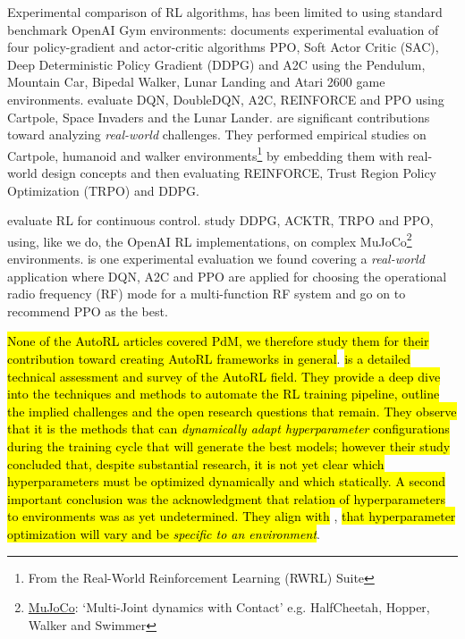 \documentclass[referee, sn-mathphys-num]{sn-jnl}
\newcommand{\hlc}[2][cyan!15]{{\colorlet{foo}{#1}\sethlcolor{foo}\hl{#2}}}
\begin{document}
	Experimental comparison of RL algorithms, has been limited to using standard benchmark OpenAI Gym environments: \cite{sandeep2022experimental} documents experimental evaluation of four policy-gradient and actor-critic algorithms PPO, Soft Actor Critic (SAC), Deep Deterministic Policy Gradient (DDPG) and A2C using the Pendulum, Mountain Car, Bipedal Walker, Lunar Landing and Atari 2600 game environments. \cite{Krishna2020} evaluate DQN, DoubleDQN, A2C, REINFORCE and PPO using Cartpole, Space Invaders and the Lunar Lander. \cite{dulac2021, dulac2020empirical} are significant contributions toward analyzing \textit{real-world} challenges. They performed empirical studies on Cartpole, humanoid and walker environments\footnote{From the Real-World Reinforcement Learning (RWRL) Suite} by embedding them with real-world design concepts and then evaluating REINFORCE, Trust Region Policy Optimization (TRPO) and DDPG.
	
	\cite{dulac2021, henderson2018deep} evaluate RL for continuous control. \cite{henderson2018deep} study DDPG, ACKTR, TRPO and PPO, using, like we do, the OpenAI RL implementations, on complex MuJoCo\footnote{\href{https://mujoco.org/}{MuJoCo}: `Multi-Joint dynamics with Contact' e.g. HalfCheetah, Hopper, Walker and Swimmer} environments. \cite{ford2022cognitive} is one experimental evaluation we found covering a \textit{real-world} application where DQN, A2C and PPO are applied for choosing the operational radio frequency (RF) mode for a multi-function RF system and go on to recommend PPO as the best.
	
	\hlc{None of the AutoRL articles covered PdM, we therefore study them for their contribution toward creating AutoRL frameworks in general}. \cite{autorl:parker2022} \hlc{is a detailed technical assessment and survey of the AutoRL field. They provide a deep dive into the techniques and methods to automate the RL training pipeline, outline the implied challenges and the open research questions that remain. They observe that it is the methods that can \textit{dynamically adapt hyperparameter} configurations during the training cycle that will generate the best models; however their study concluded that, despite substantial research, it is not yet clear which hyperparameters must be optimized dynamically and which statically. A second important conclusion was the acknowledgment that relation of hyperparameters to environments was as yet undetermined. They align with} \cite{Eimer2023AutoRL}, \hlc{that hyperparameter optimization will vary and be \textit{specific to an environment}}. 
	
\end{document}
